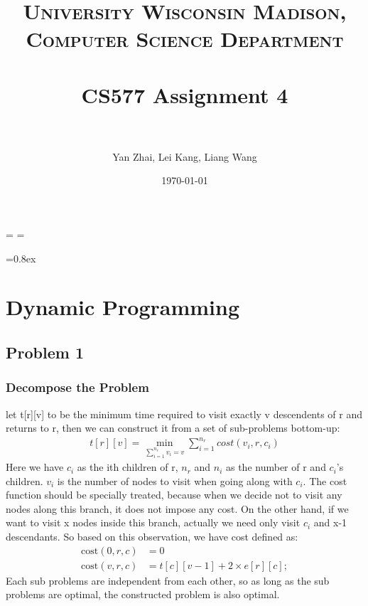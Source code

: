 \documentclass[paper=a4, fontsize=11pt]{scrartcl} %
\title{	
\normalfont \normalsize 
\textsc{University Wisconsin Madison, Computer Science Department} \\ [25pt] %
\horrule{0.5pt} \\[0.4cm] %
\huge CS577 Assignment 4\\ %
\horrule{2pt} \\[0.5cm] %
}
\author{Yan Zhai, Lei Kang, Liang Wang} %
\date{\normalsize\today} %
\numberwithin{equation}{section} %
\numberwithin{figure}{section} %
\numberwithin{table}{section} %
\begin{document}
\maketitle %

\singlespacing
\newdimen\origiwspc%
\newdimen\origiwstr%
\origiwspc=\font%
\origiwstr=\font

\font=0.8ex

\section*{Dynamic Programming}

\subsection*{Problem 1}
%
\subsubsection*{\textbf{Decompose the Problem}} let t[r][v] to be the minimum time required to visit exactly v descendents of r and returns to r, then we can construct it from a set of sub-problems bottom-up:
\begin{align*}
	t[r][v] = \min_{\sum_{i=1}^{n_r}{v_i}=v} \sum_{i=1}^{n_r}{cost(v_i, r, c_i)}
\end{align*}
Here we have $c_i$ as the ith children of r, $n_r$ and $n_i$ as the number of r and $c_i$'s children. $v_i$ is the number of nodes to visit when going along with $c_i$. The cost function should be specially treated, because when we decide not to visit any nodes along this branch, it does not impose any cost. On the other hand, if we want to visit x nodes inside this branch, actually we need only visit $c_i$ and x-1 descendants. So based on this observation, we have cost defined as:
\begin{align*}
	\text{cost}(0,r,c) &= 0 \\
	\text{cost}(v,r,c) &= t[c][v-1] + 2 \times e[r][c];
\end{align*}
Each sub problems are independent from each other, so as long as the sub problems are optimal, the constructed problem is also optimal.
\end{document}

